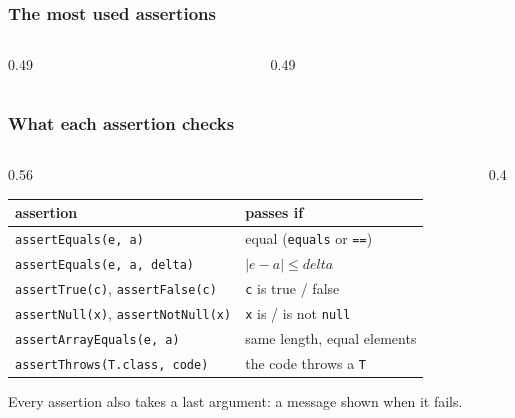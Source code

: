 \documentclass[aspectratio=169,10pt,compress]{beamer}
\begin{document}




\begin{frame}[t,fragile] \frametitle{The most used assertions}
  \begin{columns}[T]
    \begin{column}{0.49\textwidth}
    \end{column}
    \begin{column}{0.49\textwidth}
    \end{column}
  \end{columns}
\end{frame}




\begin{frame}[t,fragile] \frametitle{What each assertion checks}
  \begin{columns}[T]
    \begin{column}{0.56\textwidth}
      \begin{center}\scriptsize
      \begin{tabular}{@{}ll@{}}
        \toprule
        \textbf{assertion}                     & \textbf{passes if} \\
        \midrule
        \texttt{assertEquals(e, a)}            & equal (\texttt{equals} or \texttt{==}) \\
        \texttt{assertEquals(e, a, delta)}     & $|e - a| \le \mathit{delta}$ \\
        \texttt{assertTrue(c)}, \texttt{assertFalse(c)} & \texttt{c} is true / false \\
        \texttt{assertNull(x)}, \texttt{assertNotNull(x)} & \texttt{x} is / is not \texttt{null} \\
        \texttt{assertArrayEquals(e, a)}       & same length, equal elements \\
        \texttt{assertThrows(T.class, code)}   & the code throws a \texttt{T} \\
        \bottomrule
      \end{tabular}
      \end{center}
      \small Every assertion also takes a last argument: a message shown when it fails.
    \end{column}
    \begin{column}{0.4\textwidth}
    \end{column}
  \end{columns}
\end{frame}
\end{document}

